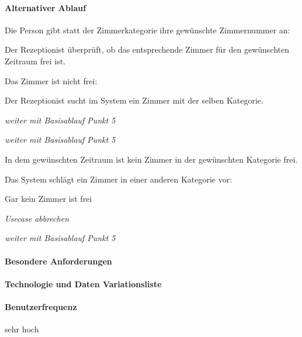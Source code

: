 \paragraph{Alternativer Ablauf}
\begin{longenum}
	\item
	\item
	\item
	\begin{longenum}
			\item Die Person gibt statt der Zimmerkategorie ihre gewünschte Zimmernummer an:
			\begin{longenum}
				\item Der Rezeptionist überprüft, ob das entsprechende Zimmer für den gewünschten Zeitraum frei ist.
				\begin{longenum}
					\item Das Zimmer ist nicht frei:
					\begin{longenum}
						\item Der Rezeptionist sucht im System ein Zimmer mit der selben Kategorie.
						\item \emph{weiter mit Basisablauf Punkt 5}
					\end{longenum}
				\end{longenum}

				\item \emph{weiter mit Basisablauf Punkt 5}
			\end{longenum}
				
	\end{longenum}
	\item
	\begin{longenum}
		\item In dem gewünschten Zeitraum ist kein Zimmer in der gewünschten Kategorie frei.
		\begin{longenum}
			\item Das System schlägt ein Zimmer in einer anderen Kategorie vor:
			\begin{longenum}
				\item Gar kein Zimmer ist frei
				\begin{longenum}
					\item \emph{Usecase abbrechen}
				\end{longenum}
			\end{longenum}
			\item \emph{weiter mit Basisablauf Punkt 5}
		\end{longenum}
	\end{longenum}
	\item
	\item
	\item
	\item
\end{longenum}

\paragraph{Besondere Anforderungen}

\paragraph{Technologie und Daten Variationsliste}

\paragraph{Benutzerfrequenz}
sehr hoch

\newpage
